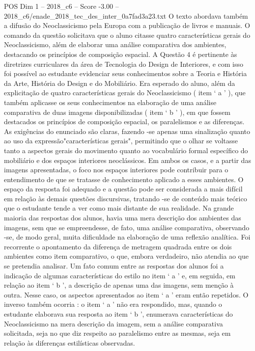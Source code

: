 \begin{textsample}{POS Dim 1 – 2018\_c6 – Score -3.00 – 2018\_c6/enade\_2018\_tec\_des\_inter\_0a7fad3a23.txt}
O texto abordava também a difusão do Neoclassicismo pela Europa com a publicação de livros e manuais.
O comando da questão solicitava que o aluno citasse quatro características gerais do Neoclassicismo, além de elaborar uma análise comparativa dos ambientes, destacando os princípios de composição espacial.
A Questão 4 é pertinente às diretrizes curriculares da área de Tecnologia do Design de Interiores, e com isso foi possível ao estudante evidenciar seus conhecimentos sobre a Teoria e História da Arte, História do Design e do Mobiliário.
Era esperado do aluno, além da explicitação de quatro características gerais do Neoclassicismo ( item ‘ a ’ ), que também aplicasse os seus conhecimentos na elaboração de uma análise comparativa de duas imagens disponibilizadas ( item ‘ b ’ ), em que fossem destacados os princípios de composição espacial, os paralelismos e as diferenças.
As exigências do enunciado são claras, fazendo -se apenas uma sinalização quanto ao uso da expressão"características gerais", permitindo que o olhar se voltasse tanto a aspectos gerais do movimento quanto ao vocabulário formal específico do mobiliário e dos espaços interiores neoclássicos.
Em ambos os casos, e a partir das imagens apresentadas, o foco nos espaços interiores pode contribuir para o entendimento de que se tratasse de conhecimento aplicado a esses ambientes.
O espaço da resposta foi adequado e a questão pode ser considerada a mais difícil em relação às demais questões discursivas, tratando -se de conteúdo mais teórico que o estudante tende a ver como mais distante de sua realidade.
Na grande maioria das respostas dos alunos, havia uma mera descrição dos ambientes das imagens, sem que se empreendesse, de fato, uma análise comparativa, observando -se, de modo geral, muita dificuldade na elaboração de uma reflexão analítica.
Foi recorrente o apontamento da diferença de metragem quadrada entre os dois ambientes como item comparativo, o que, embora verdadeiro, não atendia ao que se pretendia analisar.
Um fato comum entre as respostas dos alunos foi a indicação de algumas características do estilo no item ‘ a ’ e, em seguida, em relação ao item ‘ b ’, a descrição de apenas uma das imagens, sem menção à outra.
Nesse caso, os aspectos apresentados ao item ‘ a ’ eram então repetidos.
O inverso também ocorria : o item ‘ a ’ não era respondido, mas, quando o estudante elaborava sua resposta ao item ‘ b ’, enumerava características do Neoclassicismo na mera descrição da imagem, sem a análise comparativa solicitada, seja no que diz respeito ao paralelismo entre as mesmas, seja em relação às diferenças estilísticas observadas.

\end{textsample}
